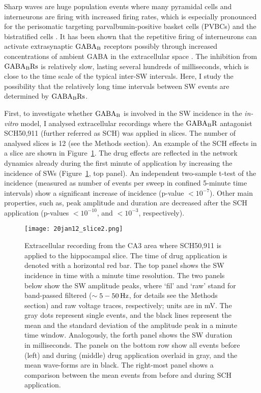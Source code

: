     Sharp waves are huge population events where many pyramidal cells and
    interneurons are firing with increased firing rates, which is especially
    pronounced for the perisomatic targeting parvalbumin-positive basket cells
    (PVBCs) and the bistratified cells \citep{Klausberger2009}. It has been
    shown that the repetitive firing of interneurons can activate extrasynaptic
    $\rm GABA_B$ receptors possibly through increased concentrations of ambient
    GABA in the extracellular space \cite{Wang2010,??}. The inhibition from
    $\rm GABA_B Rs$ is relatively slow, lasting several hundreds of
    milliseconds, which is close to the time scale of the typical inter-SW
    intervals. Here, I study the possibility that the relatively long time
    intervals between SW events are determined by $\rm GABA_B Rs$.
    
    First, to investigate whether $\rm GABA_B$ is involved in the SW incidence
    in the {\textit{in-vitro}} model, I analysed extracellular recordings where
    the $\rm GABA_B R$ antagonist SCH50,911 (further referred as SCH) was
    applied in slices. The number of analysed slices is 12 (see the Methods
    section). An example of the SCH effects in a slice are shown in
    Figure~\ref{fig:gB_example}. The drug effects are reflected in the network
    dynamics already during the first minute of application by increasing the
    incidence of SWs (Figure~\ref{fig:gB_example}, top panel). An independent
    two-sample t-test of the incidence (measured as number of events per sweep
    in confined 5-minute time intervals) show a significant increase of
    incidence (p-value $<10^{-7}$). Other main properties, such as, peak
    amplitude and duration are decreased after the SCH application (p-values
    $<10^{-10}$, and $<10^{-3}$, respectively).
    
    \begin{figure}
      \texttt{[image: 20jan12\_slice2.png]}
      \caption{ 
        Extracellular recording from the CA3 area where SCH50,911 is applied to
        the hippocampal slice. The time of drug application is denoted with a
        horizontal red bar. The top panel shows the SW incidence in time with a
        minute time resolution. The two panels below show the SW amplitude
        peaks, where `fil' and `raw' stand for band-passed filtered ($\sim
        5-50\, \rm Hz$, for details see the Methods section) and raw voltage
        traces, respectively; units are in mV. The gray dots represent single
        events, and the black lines represent the mean and the standard
        deviation of the amplitude peak in a minute time window. Analogously,
        the forth panel shows the SW duration in milliseconds. The panels on
        the bottom row show all events before (left) and during (middle) drug
        application overlaid in gray, and the mean wave-forms are in black. The
        right-most panel shows a comparison between the mean events from before
        and during SCH application.
              }
    \label{fig:gB_example}
    \end{figure}

